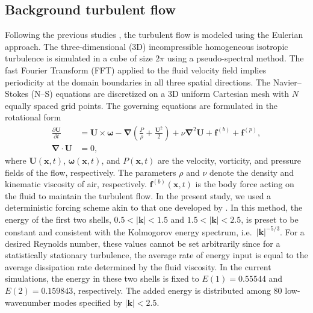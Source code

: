 \documentclass[../thesis.tex]{subfiles}
\begin{document}
\subsection{Background turbulent flow}
Following the previous studies \citep{TPARW13, APCRW14}, the turbulent flow is modeled using the Eulerian approach. The three-dimensional (3D) incompressible homogeneous isotropic turbulence is simulated in a cube of size $2\pi$ using a pseudo-spectral method. The fast Fourier Transform (FFT) applied to  the fluid velocity field implies periodicity at the domain boundaries in all three spatial directions. The Navier--Stokes (N--S) equations are discretized on a 3D uniform Cartesian mesh with $N$ equally spaced grid points. The governing equations are formulated in the rotational form
\begin{align}%
	\frac{\partial \boldsymbol{U}}{\partial t}&=\boldsymbol{U} \times  \boldsymbol{\omega} - \boldsymbol{\nabla}\left(\frac{P}{\rho}+\frac{\boldsymbol{U}^2}{2}\right)+\nu \boldsymbol{\nabla}^2\boldsymbol{U} + \boldsymbol{f}^{(b)} + \boldsymbol{f}^{(p)},\label{eq:1}\\
	\boldsymbol{\nabla \cdot U}&=0,\label{eq:2}
\end{align}%
where $\boldsymbol U(\boldsymbol x,t)$, $\boldsymbol \omega(\boldsymbol x,t)$, and $P(\boldsymbol x,t)$ are the velocity, vorticity, and pressure fields of the flow, respectively. The parameters $\rho$ and $\nu$ denote the density and kinematic viscosity of air, respectively. $\boldsymbol f^{(b)}(\boldsymbol x,t)$ is the body force acting on the fluid to maintain the turbulent flow. In the present study, we used a deterministic forcing scheme akin to that one developed by \citet{SMK94}. In this method, the energy of the first two shells, $0.5<|\boldsymbol{k}|<1.5$ and $1.5<|\boldsymbol{k}|<2.5$, is preset to be constant and consistent with the Kolmogorov energy spectrum, i.e.\ $|\boldsymbol{k}|^{-5/3}$. For a desired Reynolds number, these values cannot be set arbitrarily since for a statistically stationary turbulence, the average rate of energy input is equal to the average dissipation rate determined by the fluid viscosity. In the current simulations, the energy in these two shells is fixed to $E(1) = 0.55544$ and $E(2)=0.159843$, respectively. The added energy is distributed among 80 low-wavenumber modes specified by $|\boldsymbol{k}| <2.5$.
\end{document}
